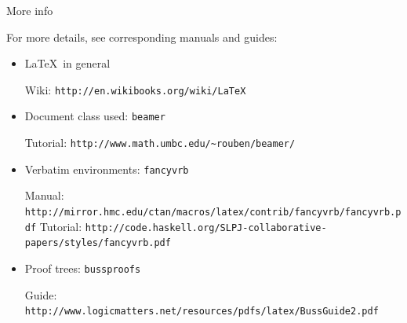 \begin{frame}[fragile]{More info}
	
	For more details, see corresponding manuals and guides:
	
	\begin{itemize}
		\item \LaTeX\ in general
		
		{\footnotesize Wiki: \verb|http://en.wikibooks.org/wiki/LaTeX|}
	
		\item Document class used: \verb|beamer|
		
		{\footnotesize Tutorial: \verb|http://www.math.umbc.edu/~rouben/beamer/|}
		
		\item Verbatim environments: \verb|fancyvrb|
		
		{\footnotesize Manual: \verb|http://mirror.hmc.edu/ctan/macros/latex/contrib/fancyvrb/fancyvrb.pdf|}
		{\footnotesize Tutorial: \verb|http://code.haskell.org/SLPJ-collaborative-papers/styles/fancyvrb.pdf|}
		
		\item Proof trees: \verb|bussproofs|

		{\footnotesize Guide: \verb|http://www.logicmatters.net/resources/pdfs/latex/BussGuide2.pdf|}
	
	\end{itemize}
	
\end{frame}

